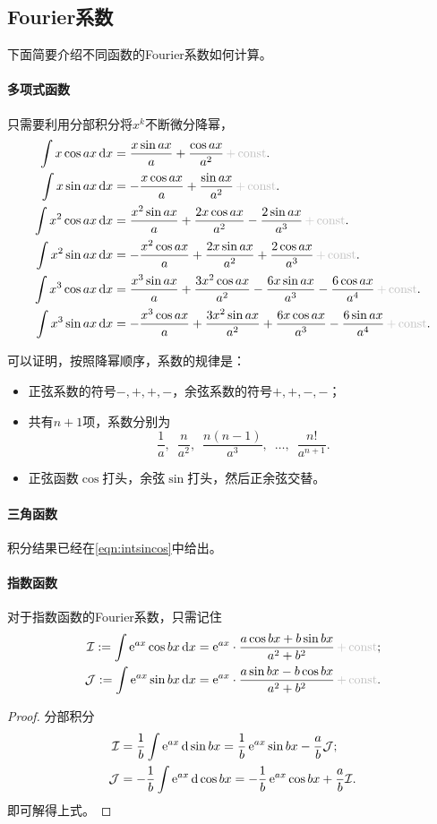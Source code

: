 \subsection{Fourier系数}

下面简要介绍不同函数的Fourier系数如何计算。

\paragraph{多项式函数}
只需要利用分部积分将$x^k$不断微分降幂，
\begin{align*}
	\int x\cos ax\d x&=\frac{x\sin ax}a+\frac{\cos ax}{a^2}\plusc.\\
	\int x\sin ax\d x&=-\frac{x\cos ax}a+\frac{\sin ax}{a^2}\plusc.\\
	\int x^2\cos ax\d x&=\frac{x^2\sin ax}a+\frac{2x\cos ax}{a^2}-\frac{2\sin ax}{a^3}\plusc.\\
	\int x^2\sin ax\d x&=-\frac{x^2\cos ax}a+\frac{2x\sin ax}{a^2}+\frac{2\cos ax}{a^3}\plusc.\\
	\int x^3\cos ax\d x&=\frac{x^3\sin ax}a+\frac{3x^2\cos ax}{a^2}-\frac{6x\sin ax}{a^3}-\frac{6\cos ax}{a^4}\plusc.\\
	\int x^3\sin ax\d x&=-\frac{x^3\cos ax}a+\frac{3x^2\sin ax}{a^2}+\frac{6x\cos ax}{a^3}-\frac{6\sin ax}{a^4}\plusc.
\end{align*}
\begin{remark}可以证明，按照降幂顺序，系数的规律是：
	\begin{itemize}
		\item 正弦系数的符号$-,+,+,-$，余弦系数的符号$+,+,-,-$；
		\item 共有$n+1$项，系数分别为
		\[
			\frac1a,\enspace\frac n{a^2},\enspace\frac{n(n-1)}{a^3},\enspace\ldots,\enspace\frac{n!}{a^{n+1}}.
		\]
		\item 正弦函数$\cos$打头，余弦$\sin$打头，然后正余弦交替。
	\end{itemize}
\end{remark}

\paragraph{三角函数}
积分结果已经在\eqref{eqn:intsincos}中给出。

\paragraph{指数函数}
对于指数函数的Fourier系数，只需记住
\begin{align*}
	\mathcal I:=\int\e{ax}\cos bx\d x=\e{ax}\cdot\frac{a\cos bx+b\sin bx}{a^2+b^2}\plusc;\\
	\mathcal J:=\int\e{ax}\sin bx\d x=\e{ax}\cdot\frac{a\sin bx-b\cos bx}{a^2+b^2}\plusc.
\end{align*}
\begin{proof}
	分部积分
	\begin{align*}
		\mathcal I&=\frac1b\int\mathop{}\!\mathrm{e}^{ax}\mathop{}\!\mathrm{d}\sin bx=\frac1b\mathop{}\!\mathrm{e}^{ax}\sin bx-\frac ab\mathcal J;\\
		\mathcal J&=-\frac1b\int\mathop{}\!\mathrm{e}^{ax}\mathop{}\!\mathrm{d}\cos bx=-\frac1b\mathop{}\!\mathrm{e}^{ax}\cos bx+\frac ab\mathcal I.
	\end{align*}
	即可解得上式。
\end{proof}

